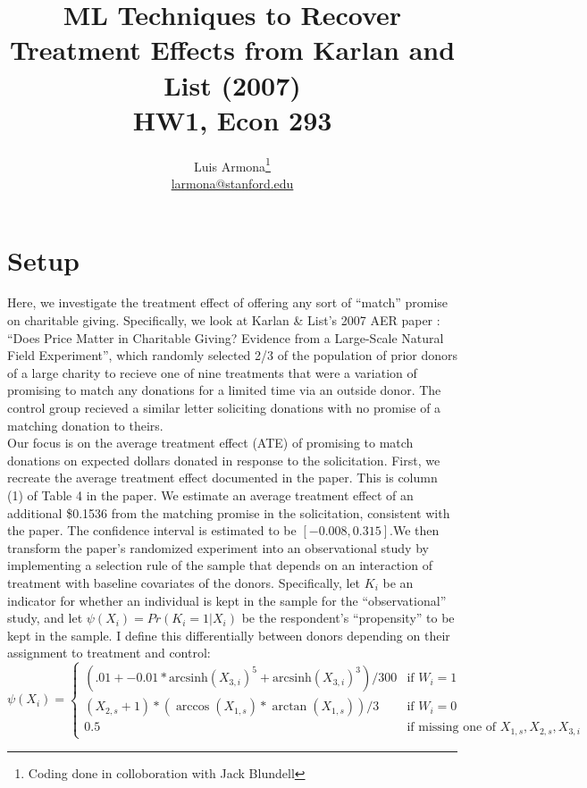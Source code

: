 \documentclass{article}
\begin{document}
\newcommand{\ihs}{\mathrm{arcsinh}}
\title{ML Techniques to Recover Treatment Effects from Karlan and List (2007) \\ HW1, Econ 293}
\author{Luis Armona\footnote{Coding done in colloboration with Jack Blundell} \\ \href{mailto:larmona@stanford.edu}{larmona@stanford.edu} }
\maketitle

\section{Setup}
Here, we investigate the treatment effect of offering any sort of ``match'' promise on charitable giving. Specifically, we look at Karlan \& List's 2007 AER paper : ``Does Price Matter in Charitable Giving? Evidence from a Large-Scale Natural Field Experiment'', which randomly selected 2/3 of the population of prior donors of a large charity to recieve one of nine treatments that were a variation of promising to match any donations for a limited time via an outside donor. The control group recieved a similar letter soliciting donations with no promise of a matching donation to theirs. \\ \indent
Our focus is on the average treatment effect (ATE) of promising to match donations on expected dollars donated in response to the solicitation. First, we recreate the average treatment effect documented in the paper. This is column (1) of Table 4 in the paper. We estimate an average treatment effect of an additional
\$0.1536 from the matching promise in the solicitation, consistent with the paper. The confidence interval is estimated to be $[-0.008,0.315]$.We then transform the paper's randomized experiment into an observational study by implementing a selection rule of the sample that depends on an interaction of treatment with baseline covariates of the donors. Specifically, let $K_i$ be an indicator for whether an individual is kept in the sample for the ``observational'' study, and let $\psi(X_i) = Pr(K_i=1|X_i)$ be the respondent's ``propensity'' to be kept in the sample. I define this differentially between donors depending on their assignment to treatment and control:
\[
  \psi(X_i)= \begin{cases}
  	  (.01 + -0.01*\ihs(X_{3,i})^5 + \ihs(X_{3,i})^3)/300 & \text{if $W_i=1$} \\
	  (X_{2,s}+1)*(\arccos(X_{1,s})*\arctan(X_{1,s}) )/3 & \text{if $W_i=0$} \\ 
     0.5 & \text{if missing one of $X_{1,s},X_{2,s},X_{3,i}$}
      \end{cases} 
\]
\end{document}
